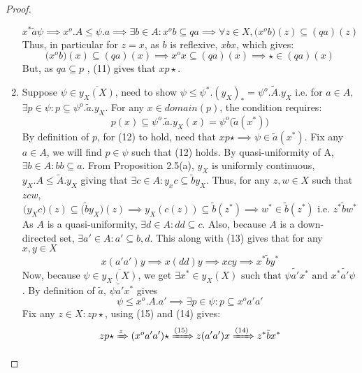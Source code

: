 \documentclass[18pt,a4paper]{article}
\theoremstyle{definition}
\begin{document}
\begin{proof}
\begin{enumerate}[label=(\alph*)]
				\begin{equation} x^* \tilde{a} \psi \implies x^o.A \leq \psi.a
					\implies \exists b\in A: x^ob \subseteq qa
					\implies \forall z \in X, \big(x^o b \big)(z) \subseteq (qa)(z)
				\end{equation}
				Thus, in particular for $z=x$, as $b$ is reflexive, $xbx$, which gives:
				\begin{equation} \big(x^o b \big)(x) \subseteq (qa)(x) \implies x^ox \subseteq (qa)(x) \implies \star \in (qa)(x) \end{equation}
				But, as $qa \subseteq p$ , (11) gives that $xp\star$.
			\item Suppose $\psi \in \overline{y_X(X)}$, need to show $\psi \leq \psi^*.(y_X)_*=\psi^o.\tilde{A}.y_X$ i.e.
				for $a \in A,$ $\exists p \in \psi: p \subseteq \psi^o.\tilde{a}.y_X$. For any $x \in domain(p)$,
				the condition requires:
				\begin{equation}
					p(x) \subseteq  \psi^o.\tilde{a} .y_X(x)=\psi^o\big(\tilde{a} (x^*)\big)
				\end{equation}
				By definition of $p$, for (12) to hold, need that $xp\star \implies \psi \in \tilde{a}(x^*) $. Fix
				any $a\in A$, we will find $p \in \psi$ such that (12) holds. By quasi-uniformity of A,
				$\exists b \in A: bb \subseteq a$. From Proposition 2.5(a), $y_X$ is uniformly continuous,
				$y_X.A \leq \tilde{A}.y_X $ giving that $\exists c \in A: y_xc \subseteq \tilde{b}y_X $. Thus, for
				any $z,w\in X$ such that $z c w$,
				\begin{equation} \big(y_X c \big)(z) \subseteq \big(\tilde{b} y_X\big)(z) \implies
					y_X(c(z)) \subseteq \tilde{b}(z^*) \implies w^* \in \tilde{b}(z^*) \text{ i.e. } z^* \tilde{b} w^*
				\end{equation}
				As $A$ is a quasi-uniformity, $\exists d\in A: dd \subseteq c$. Also, because $A$ is a down-
				directed set, $\exists a' \in A: a' \subseteq b,d $. This along with (13) gives that
				for any $x,y \in X$
				\begin{equation} x(a'a')y \implies x(dd)y \implies xcy \implies x^* \tilde{b} y^* \end{equation}
				Now, because $\psi \in \overline{y_X(X)}$, we get
				$\exists x^* \in y_X(X) \text{ such that } \psi \tilde{a'}x^* \text{ and } x^* \tilde{a'} \psi $.
				By definition of $\tilde{a}$, $\psi \tilde{a'}x^*$ gives
				\begin{equation} \psi \leq x^o.A.a' \implies \exists p \in \psi: p \subseteq x^o a'a' \end{equation}
				Fix any $z \in X : zp \star$, using (15) and (14) gives:
				\begin{equation} zp \star \xRightarrow z(x^o a'a') \star \xRightarrow{(15)} z(a'a')x
				\xRightarrow{(14)} z^* \tilde{b}x^*   \end{equation}


\end{enumerate}
\end{proof}
\end{document}
